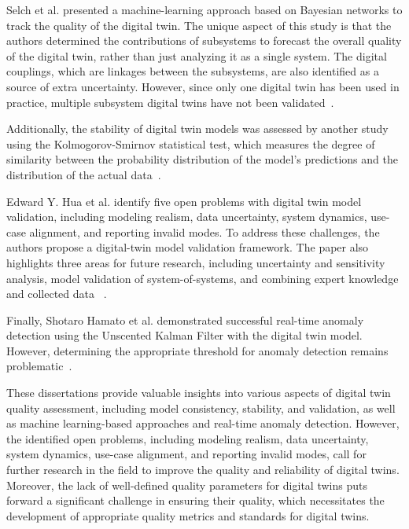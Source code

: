 \documentclass{llncs}
\begin{document}
    Selch et al. presented a machine-learning approach based on Bayesian networks to track the quality of the digital twin. 
    The unique aspect of this study is that the authors determined the contributions of subsystems to forecast the overall quality of the digital twin, 
    rather than just analyzing it as a single system. The digital couplings, which are linkages between the subsystems, are also identified as a source of extra uncertainty. 
    However, since only one digital twin has been used in practice, multiple subsystem digital twins have not been validated~\cite{QualityMonitoringofCoupledDigitalTwins}.

    Additionally, the stability of digital twin models was assessed by another study using the Kolmogorov-Smirnov statistical test, 
    which measures the degree of similarity between the probability distribution of the model's predictions and the distribution of the actual data~\cite{RadarDigitalTwin}.

    Edward Y. Hua et al. identify five open problems with digital twin model validation, including modeling realism, data uncertainty, system dynamics, use-case alignment, and reporting invalid modes.
    To address these challenges, the authors propose a digital-twin model validation framework. The paper also highlights three areas for future research, 
    including uncertainty and sensitivity analysis, model validation of system-of-systems, and combining expert knowledge and collected data ~\cite{ValidationofDigitalTwins}. 

    Finally, Shotaro Hamato et al. demonstrated successful real-time anomaly detection using the Unscented Kalman Filter with the digital twin model. 
    However, determining the appropriate threshold for anomaly detection remains problematic~\cite{JapeneseKalmanFilterCorrectness}.

    These dissertations provide valuable insights into various aspects of digital twin quality assessment, including model consistency, stability, and validation, as well as machine learning-based approaches and real-time anomaly detection. 
    However, the identified open problems, including modeling realism, data uncertainty, system dynamics, use-case alignment, and reporting invalid modes, call for further research in the field to improve the quality and reliability of digital twins. Moreover, 
    the lack of well-defined quality parameters for digital twins puts forward a significant challenge in ensuring their quality, which necessitates the development of appropriate quality metrics and standards for digital twins.
  
\end{document}
